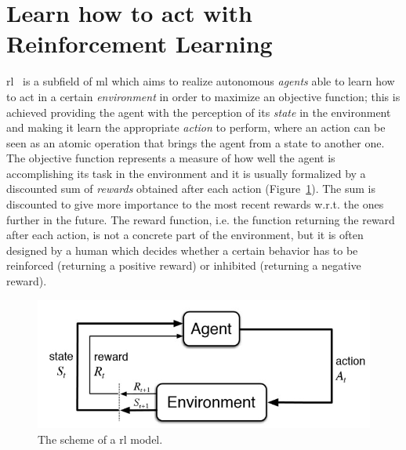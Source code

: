 \section{Learn how to act with Reinforcement Learning}
\gls{rl}~\cite{sutton1998reinforcement} is a subfield of \gls{ml} which aims to realize autonomous \textit{agents} able to learn how to act in a certain \textit{environment} in order to maximize an objective function; this is achieved providing the agent with the perception of its \textit{state} in the environment and making it learn the appropriate \textit{action} to perform, where an action can be seen as an atomic operation that brings the agent from a state to another one. The objective function represents a measure of how well the agent is accomplishing its task in the environment and it is usually formalized by a discounted sum of \textit{rewards} obtained after each action (Figure~\ref{F:rl}). The sum is discounted to give more importance to the most recent rewards w.r.t. the ones further in the future. The reward function, i.e. the function returning the reward after each action, is not a concrete part of the environment, but it is often designed by a human which decides whether a certain behavior has to be reinforced (returning a positive reward) or inhibited (returning a negative reward).

\begin{figure}[t]
\begin{minipage}{\textwidth}
\begin{center}
  \includegraphics[scale=.75]{img/rl.jpg}
\end{center}
\end{minipage}
\caption[Reinforcement Learning problem scheme]{The scheme of a \gls{rl} model.}\label{F:rl}
\end{figure}

